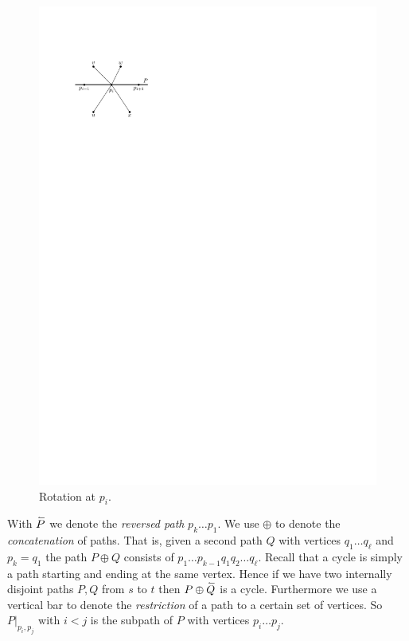     \begin{figure}[h]
      \centering
      \includegraphics[scale=1]{unifiedAlgo/img/rightNeighbourwalk/rotation}
      \caption{Rotation at $p_i$.}
      \label{fig:right:rot}
    \end{figure}

    With $\accentset{\leftharpoonup}{P}$ we denote the \emph{reversed path} $p_k \ldots p_1$. We use $\oplus$ to denote the \emph{concatenation} of paths.
    That is, given a second path $Q$ with vertices $q_1 \ldots q_\ell$ and $p_k = q_1$ the path $P \oplus Q$ consists of $p_1 \ldots p_{k-1} q_1 q_2 \ldots q_\ell$.
    Recall that a cycle is simply a path starting and ending at the same vertex.
    Hence if we have two  internally disjoint paths $P, Q$ from $s$ to $t$ then $P \oplus \accentset{\leftharpoonup}{Q}$ is a cycle.
    Furthermore we use a vertical bar to denote the \emph{restriction} of a path to a certain set of vertices. So $P|_{p_i, p_j}$ with $i<j$ is the subpath of $P$ with vertices $p_i \ldots p_j$.

